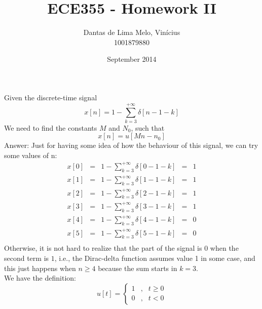 \documentclass{article}
\title{ECE355 - Homework II}
\author{Dantas de Lima Melo, Vinícius \\ \small{1001879880}}
\date{September 2014}
\begin{document}
\maketitle

\section{}
\setcounter{subsection}{11}
\subsection{} Given the discrete-time signal \\
\begin{equation*}
x[n] = 1 - \sum\limits_{k=3}^{+\infty} \delta[n-1-k]
\end{equation*}
We need to find the constants $M$ and $N_{0}$, such that
\begin{equation}
x[n] = u[Mn - n_{0}]
\label{eq:signal112}
\end{equation}
Answer: Just for having some idea of how the behaviour of this signal, we can try some values of n:
\begin{equation*}
  \begin{array}{lllll}
    x[0] &=& 1 - \sum\limits_{k=3}^{+\infty} \delta[0- 1-k]&=& 1\\
    x[1] &=& 1 - \sum\limits_{k=3}^{+\infty} \delta[1- 1-k]&=& 1\\
    x[2] &=& 1 - \sum\limits_{k=3}^{+\infty} \delta[2- 1-k]&=& 1\\
    x[3] &=& 1 - \sum\limits_{k=3}^{+\infty} \delta[3- 1-k]&=& 1\\
    x[4] &=& 1 - \sum\limits_{k=3}^{+\infty} \delta[4- 1-k]&=& 0\\
    x[5] &=& 1 - \sum\limits_{k=3}^{+\infty} \delta[5- 1-k]&=& 0\\
  \end{array}
\end{equation*}
Otherwise, it is not hard to realize that the part of the signal is $0$ when the second term is $1$, i.e., the Dirac-delta function assumes value 1 in some case, and this just happens when $n \geq 4$ because the sum starts in $k=3$. \\
We have the definition:
\begin{equation*}
u[t] =\left\{ \begin{array}{lll} 1 &,& t \geq 0 \\ 0 &,& t < 0\end{array} \right.
\end{equation*}
\end{document}
